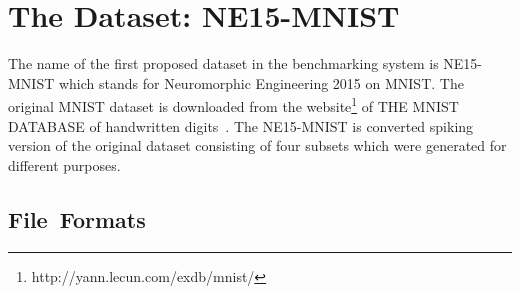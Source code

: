 \section{The Dataset: NE15-MNIST}
\label{sec:data}
The name of the first proposed dataset in the benchmarking system is NE15-MNIST which stands for Neuromorphic Engineering 2015 on MNIST.
The original MNIST dataset is downloaded from the website\footnote{http://yann.lecun.com/exdb/mnist/} of THE MNIST DATABASE of handwritten digits~\cite{lecun_gradient-based_1998}.
The NE15-MNIST is converted spiking version of the original dataset consisting of four subsets which were generated for different purposes.
\subsection{File~Formats}

